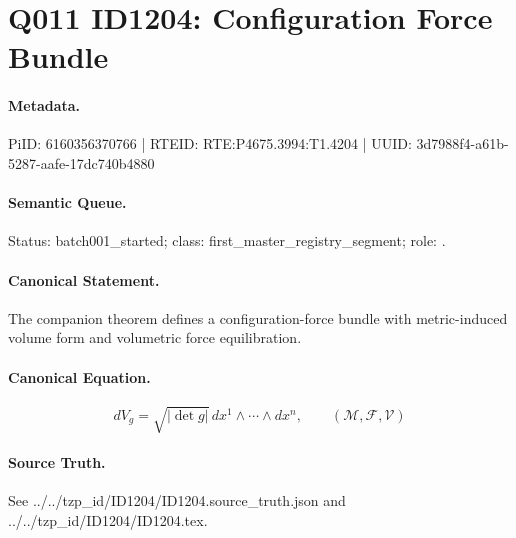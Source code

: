 \section*{Q011 ID1204: Configuration Force Bundle}
\paragraph{Metadata.}
PiID: 6160356370766 | RTEID: RTE:P4675.3994:T1.4204 | UUID: 3d7988f4-a61b-5287-aafe-17dc740b4880

\paragraph{Semantic Queue.}
Status: batch001\_started; class: first\_master\_registry\_segment; role: .

\paragraph{Canonical Statement.}
The companion theorem defines a configuration-force bundle with metric-induced volume form and volumetric force equilibration.

\paragraph{Canonical Equation.}
\[
dV_g=\sqrt{|\det g|}\,dx^1\wedge\cdots\wedge dx^n,\qquad(\mathcal{M},\mathcal{F},\mathcal{V})
\]

\paragraph{Source Truth.}
See ../../tzp\_id/ID1204/ID1204.source\_truth.json and ../../tzp\_id/ID1204/ID1204.tex.

